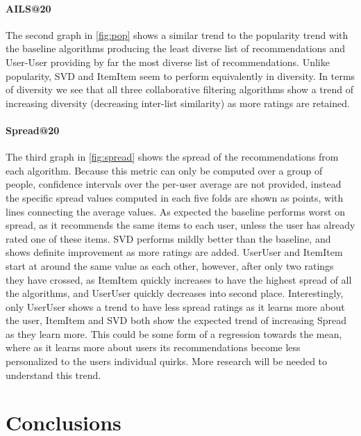 \documentclass[letterpaper]{sig-alternate}
\begin{document}
  \paragraph{AILS@20}
  The second graph in \ref{fig:pop} shows a similar trend to the popularity trend with the baseline algorithms producing the least diverse list of recommendations and User-User providing by far the most diverse list of recommendations.
  Unlike popularity, SVD and ItemItem seem to perform equivalently in diversity.
  In terms of diversity we see that all three collaborative filtering algorithms show a trend of increasing diversity (decreasing  inter-list similarity) as more ratings are retained.

  \paragraph{Spread@20}
  The third graph in \ref{fig:spread} shows the spread of the recommendations from each algorithm.
  Because this metric can only be computed over a group of people, confidence intervals over the per-user average are not provided, instead the specific spread values computed in each five folds are shown as points, with lines connecting the average values.
  As expected the baseline performs worst on spread, as it recommends the same items to each user, unless the user has already rated one of these items.
  SVD performs mildly better than the baseline, and shows definite improvement as more ratings are added.
  UserUser and ItemItem start at around the same value as each other, however, after only two ratings they have crossed, as ItemItem quickly increases to have the highest spread of all the algorithms, and UserUser quickly decreases into second place.
  Interestingly, only UserUser shows a trend to have less spread ratings as it learns more about the user, ItemItem and SVD both show the expected trend of increasing Spread as they learn more.
  This could be some form of a regression towards the mean, where as it learns more about users its recommendations become less personalized to the users individual quirks.
  More research will be needed to understand this trend.
  
\section{Conclusions}
\end{document}
